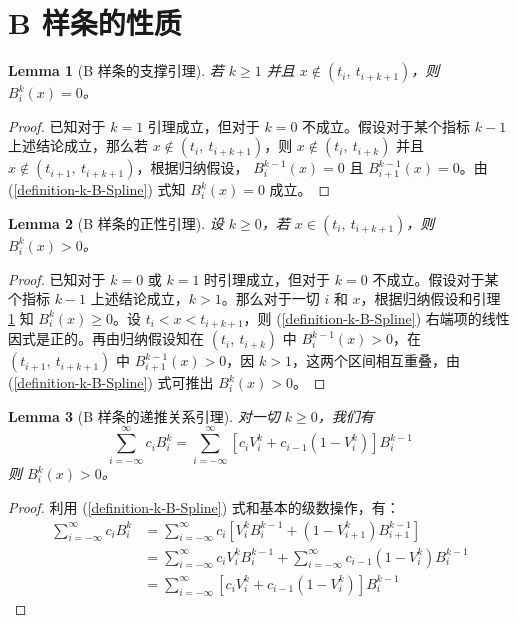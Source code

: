 \documentclass[a4paper]{article}
\newtheorem{lemma}{Lemma}
\begin{document}
\section{B 样条的性质}

\begin{lemma}[B 样条的支撑引理]
\label{lemma-B-Spline-Suppport}
    若 $k \geqslant 1$ 并且 $x \notin (t_{i},\ t_{i+k+1})$，则 $B_i^k(x) = 0$。
\end{lemma}
\begin{proof}[Proof]
    已知对于 $k = 1$ 引理成立，但对于 $k = 0$ 不成立。假设对于某个指标 $k-1$ 上述结论成立，那么若 $x \notin (t_{i},\ t_{i+k+1})$，则 $x \notin (t_i,\ t_{i+k})$ 并且 $x \notin (t_{i+1},\ t_{i+k+1})$，根据归纳假设， $B_{i}^{k-1}(x) = 0$ 且 $B_{i+1}^{k-1}(x) = 0$。由 (\ref{definition-k-B-Spline}) 式知 $B_i^k(x) = 0$ 成立。
\end{proof}

\begin{lemma}[B 样条的正性引理]
\label{lemma-B-Spline-Positive}
    设 $k \geqslant 0$，若 $x \in (t_{i},\ t_{i+k+1})$，则 $B_i^k(x) > 0$。
\end{lemma}
\begin{proof}[Proof]
    已知对于 $k = 0$ 或 $k = 1$ 时引理成立，但对于 $k = 0$ 不成立。假设对于某个指标 $k-1$ 上述结论成立，$k > 1$。那么对于一切 $i$ 和 $x$，根据归纳假设和引理 \ref{lemma-B-Spline-Suppport} 知 $B_i^k(x) \geqslant 0$。设 $t_{i} < x < t_{i+k+1}$，则 (\ref{definition-k-B-Spline}) 右端项的线性因式是正的。再由归纳假设知在 $(t_{i},\ t_{i+k})$ 中 $B_{i}^{k-1}(x) > 0$，在 $(t_{i+1},\ t_{i+k+1})$ 中 $B_{i+1}^{k-1}(x) > 0$，因 $k > 1$，这两个区间相互重叠，由 (\ref{definition-k-B-Spline}) 式可推出 $B_i^k(x) > 0$。
\end{proof}

\begin{lemma}[B 样条的递推关系引理]
\label{lemma-B-Spline-Recursive}
    对一切 $k \geqslant 0$，我们有
    \begin{equation}
        \sum_{i = -\infty}^{\infty} c_i B_i^k = \sum_{i = -\infty}^{\infty} \left[ c_i V_i^k + c_{i-1} (1 - V_i^k) \right] B_{i}^{k-1}
    \end{equation}
    则 $B_i^k(x) > 0$。
\end{lemma}
\begin{proof}[Proof]
    利用 (\ref{definition-k-B-Spline}) 式和基本的级数操作，有：
    \begin{equation}
    \begin{aligned}
        \sum_{i = -\infty}^{\infty} c_i B_i^k & = \sum_{i = -\infty}^{\infty} c_i \left[ V_{i}^{k} B_{i}^{k-1} + (1 - V_{i+1}^{k}) B_{i+1}^{k-1} \right] \\
        & = \sum_{i = -\infty}^{\infty} c_i V_{i}^{k} B_{i}^{k-1} + \sum_{i = -\infty}^{\infty} c_{i-1} (1 - V_{i}^{k}) B_{i}^{k-1} \\
        & = \sum_{i = -\infty}^{\infty} \left[ c_i V_i^k + c_{i-1} (1 - V_i^k) \right] B_{i}^{k-1}
    \end{aligned}
    \end{equation}
\end{proof}
\end{document}

